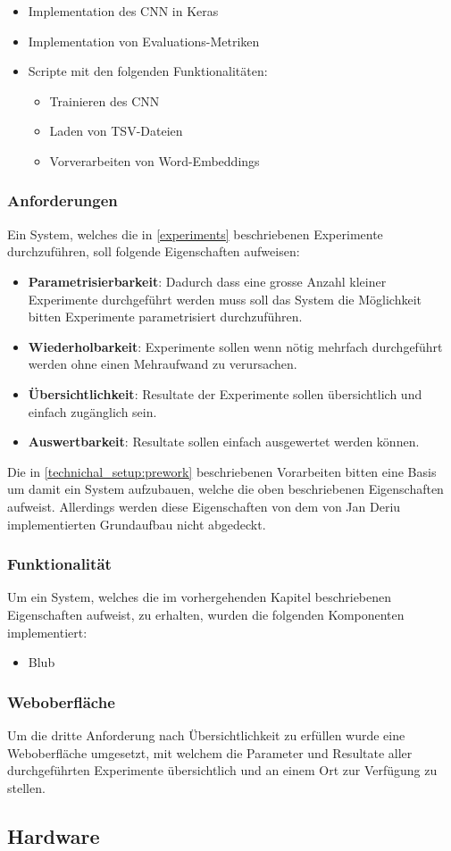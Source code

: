 \begin{itemize}
	\item Implementation des CNN in Keras
	\item Implementation von Evaluations-Metriken
	\item Scripte mit den folgenden Funktionalitäten:
	\begin{itemize}
		\item Trainieren des CNN
		\item Laden von TSV-Dateien
		\item Vorverarbeiten von Word-Embeddings
	\end{itemize}
\end{itemize}
\subsubsection{Anforderungen}
\label{technical_setup:requirements}
Ein System, welches die in \ref{experiments} beschriebenen Experimente durchzuführen, soll folgende Eigenschaften aufweisen:

\begin{itemize}
	\item \textbf{Parametrisierbarkeit}: Dadurch dass eine grosse Anzahl kleiner Experimente durchgeführt werden muss soll das System die Möglichkeit bitten Experimente parametrisiert durchzuführen.
	\item \textbf{Wiederholbarkeit}: Experimente sollen wenn nötig mehrfach durchgeführt werden ohne einen Mehraufwand zu verursachen. 
	\item \textbf{Übersichtlichkeit}: Resultate der Experimente sollen übersichtlich und einfach zugänglich sein.
	\item \textbf{Auswertbarkeit}: Resultate sollen  einfach ausgewertet werden können.
\end{itemize}

Die in \ref{technichal_setup:prework} beschriebenen Vorarbeiten bitten eine Basis um damit ein System aufzubauen, welche die oben beschriebenen Eigenschaften aufweist. Allerdings werden diese Eigenschaften von dem von Jan Deriu implementierten Grundaufbau nicht abgedeckt.
\subsubsection{Funktionalität}
Um ein System, welches die im vorhergehenden Kapitel beschriebenen Eigenschaften aufweist, zu erhalten, wurden die folgenden Komponenten implementiert:

\begin{itemize}
	\item Blub
\end{itemize}
\subsubsection{Weboberfläche}
Um die dritte Anforderung nach Übersichtlichkeit zu erfüllen wurde eine Weboberfläche umgesetzt, mit welchem die Parameter und Resultate aller durchgeführten Experimente übersichtlich und an einem Ort zur Verfügung zu stellen.
\subsection{Hardware}
\blindtext